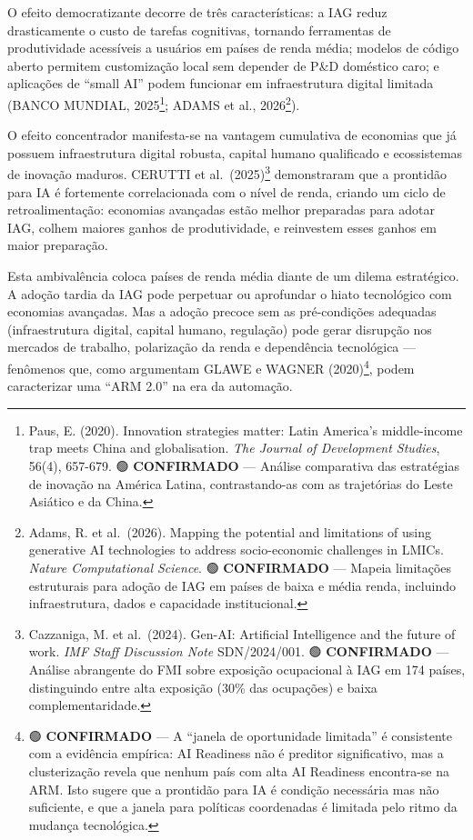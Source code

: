 \documentclass[
  brazilian,
  12pt,
]{article}
\begin{document}
O efeito democratizante decorre de três características: a IAG reduz drasticamente o custo de tarefas cognitivas, tornando ferramentas de produtividade acessíveis a usuários em países de renda média; modelos de código aberto permitem customização local sem depender de P\&D doméstico caro; e aplicações de ``small AI'' podem funcionar em infraestrutura digital limitada (BANCO MUNDIAL, 2025\footnote{Paus, E. (2020). Innovation strategies matter: Latin America's middle-income trap meets China and globalisation. \emph{The Journal of Development Studies}, 56(4), 657-679. 🟢 \textbf{CONFIRMADO} --- Análise comparativa das estratégias de inovação na América Latina, contrastando-as com as trajetórias do Leste Asiático e da China.}; ADAMS et al., 2026\footnote{Adams, R. et al.~(2026). Mapping the potential and limitations of using generative AI technologies to address socio-economic challenges in LMICs. \emph{Nature Computational Science}. 🟢 \textbf{CONFIRMADO} --- Mapeia limitações estruturais para adoção de IAG em países de baixa e média renda, incluindo infraestrutura, dados e capacidade institucional.}).

O efeito concentrador manifesta-se na vantagem cumulativa de economias que já possuem infraestrutura digital robusta, capital humano qualificado e ecossistemas de inovação maduros. CERUTTI et al.~(2025)\footnote{Cazzaniga, M. et al.~(2024). Gen-AI: Artificial Intelligence and the future of work. \emph{IMF Staff Discussion Note} SDN/2024/001. 🟢 \textbf{CONFIRMADO} --- Análise abrangente do FMI sobre exposição ocupacional à IAG em 174 países, distinguindo entre alta exposição (30\% das ocupações) e baixa complementaridade.} demonstraram que a prontidão para IA é fortemente correlacionada com o nível de renda, criando um ciclo de retroalimentação: economias avançadas estão melhor preparadas para adotar IAG, colhem maiores ganhos de produtividade, e reinvestem esses ganhos em maior preparação.

Esta ambivalência coloca países de renda média diante de um dilema estratégico. A adoção tardia da IAG pode perpetuar ou aprofundar o hiato tecnológico com economias avançadas. Mas a adoção precoce sem as pré-condições adequadas (infraestrutura digital, capital humano, regulação) pode gerar disrupção nos mercados de trabalho, polarização da renda e dependência tecnológica --- fenômenos que, como argumentam GLAWE e WAGNER (2020)\footnote{🟢 \textbf{CONFIRMADO} --- A ``janela de oportunidade limitada'' é consistente com a evidência empírica: AI Readiness não é preditor significativo, mas a clusterização revela que nenhum país com alta AI Readiness encontra-se na ARM. Isto sugere que a prontidão para IA é condição necessária mas não suficiente, e que a janela para políticas coordenadas é limitada pelo ritmo da mudança tecnológica.}, podem caracterizar uma ``ARM 2.0'' na era da automação.
\end{document}
